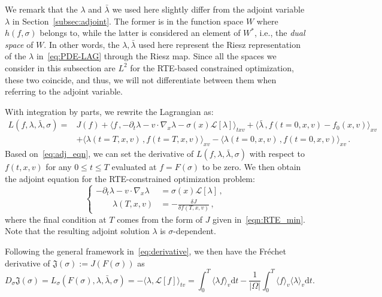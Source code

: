 \documentclass[12pt]{amsart}
\newcommand{\rd}{\mathrm{d}}
\begin{document}
We remark that the $\lambda$ and $\bar{\lambda}$ we used here slightly differ from the adjoint variable $\lambda$ in Section~\ref{subsec:adjoint}. The former is in the function space $W$ where $h(f,\sigma)$ belongs to,  while the latter is considered an element of $W^*$, i.e., the \textit{dual space} of $W$. In other words, the $\lambda,\bar{\lambda}$ used here represent the Riesz representation of the $\lambda$ in~\eqref{eq:PDE-LAG} through the Riesz map. Since all the spaces we consider in this subsection are $L^2$ for the RTE-based constrained optimization, these two coincide, and thus, we will not differentiate between them when referring to the adjoint variable.


With integration by parts, we rewrite the Lagrangian as:
\[
\begin{aligned}
L(f,\lambda, \bar{\lambda}, \sigma) = & J(f) +  \langle f\,, -\partial_t \lambda - v\cdot\nabla_x \lambda - \sigma(x)\mathcal{L}[\lambda]\rangle_{txv} + \langle \bar{\lambda}\,,f(t=0,x,v) - f_0(x,v)\rangle_{xv}\\
& + \langle \lambda(t=T,x,v)\,, f(t=T,x,v)\rangle_{xv} - \langle \lambda(t=0,x,v)\,, f(t=0,x,v)\rangle_{xv} \,.
\end{aligned}
\]
Based on~\eqref{eq:adj_eqn}, we can set the derivative of $L(f,\lambda, \bar{\lambda}, \sigma)$ with respect to $f(t,x,v)$ for any $0\leq t \leq T$ evaluated at $f = F(\sigma)$ to be zero. We then obtain the adjoint equation for the RTE-constrained optimization problem:
\begin{equation}\label{eqn:g_eqn}
\begin{cases}
- \partial_t \lambda  - v\cdot\nabla_x \lambda &=  \sigma(x)\mathcal{L}[\lambda]\,, \\
\qquad \lambda(T,x,v) &=   - \frac{\delta J}{\delta f(T,x,v)} \,,
\end{cases}
\end{equation}
where the final condition at $T$ comes from the form of $J$ given in~\eqref{eqn:RTE_min}. Note that the resulting adjoint solution $\lambda$ is $\sigma$-dependent.

Following the general framework in~\eqref{eq:derivative}, we then have the Fr\'echet derivative of $\mathfrak{J}(\sigma) := J(F(\sigma))$ as
\begin{equation}\label{eq:RTE_OTD_grad}
    D_\sigma \mathfrak{J}(\sigma) = L_\sigma(F(\sigma),\lambda,\bar{\lambda}, \sigma) =  - \langle \lambda , \mathcal{L}[f] \rangle_{tv} = \int_0^T  \langle \lambda f\rangle_v \rd t - \frac{1}{|\Omega| } \int_{0}^T \langle f\rangle_v \langle \lambda \rangle_v \rd t.
\end{equation}
\end{document}
